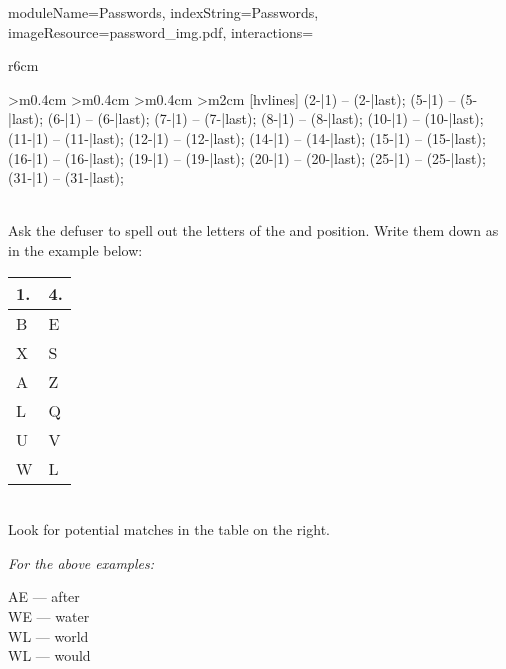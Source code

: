 \documentclass{../../ktane-mod}
\begin{document}
\begin{module}{
  moduleName=Passwords,
  indexString=Passwords,
  imageResource=password_img.pdf,
  interactions=\keysymbol
}
\begin{wraptable}{r}{6cm}
\begin{NiceTabular}{
    >{\centering\arraybackslash}m{0.4cm}
    >{\centering\arraybackslash}m{0.4cm}
    >{\centering\arraybackslash}m{0.4cm}
    >{\centering\arraybackslash}m{2cm}
    }[hvlines]
      \tikz \draw[line width=2pt, line cap=rect] (2-|1) -- (2-|last);   %
      \tikz \draw[line width=2pt, line cap=rect] (5-|1) -- (5-|last);   %
      \tikz \draw[line width=2pt, line cap=rect] (6-|1) -- (6-|last);   %
      \tikz \draw[line width=2pt, line cap=rect] (7-|1) -- (7-|last);   %
      \tikz \draw[line width=2pt, line cap=rect] (8-|1) -- (8-|last);   %
      \tikz \draw[line width=2pt, line cap=rect] (10-|1) -- (10-|last); %
      \tikz \draw[line width=2pt, line cap=rect] (11-|1) -- (11-|last); %
      \tikz \draw[line width=2pt, line cap=rect] (12-|1) -- (12-|last); %
      \tikz \draw[line width=2pt, line cap=rect] (14-|1) -- (14-|last); %
      \tikz \draw[line width=2pt, line cap=rect] (15-|1) -- (15-|last); %
      \tikz \draw[line width=2pt, line cap=rect] (16-|1) -- (16-|last); %
      \tikz \draw[line width=2pt, line cap=rect] (19-|1) -- (19-|last); %
      \tikz \draw[line width=2pt, line cap=rect] (20-|1) -- (20-|last); %
      \tikz \draw[line width=2pt, line cap=rect] (25-|1) -- (25-|last); %
      \tikz \draw[line width=2pt, line cap=rect] (31-|1) -- (31-|last); %
    \end{NiceTabular}
  \end{wraptable}
\medskip\\
  Ask the defuser to spell out the letters of the \YELLOW[first] and \YELLOW[fourth] position.
  Write them down as in the example below:

  \quad\begin{tabular}{ll}
    \textbf{1.} & \textbf{4.}\\
    \hline
    B  & E \\
    X  & S \\
    A  & Z \\
    L  & Q \\
    U  & V \\
    W  & L \\
  \end{tabular}

  \medskip\\
  Look for potential matches in the table on the right.

  \textit{For the above examples:}

  \quad AE --- after\\
  \quad WE --- water\\
  \quad WL --- world\\
  \quad WL --- would


\end{module}
\end{document}
